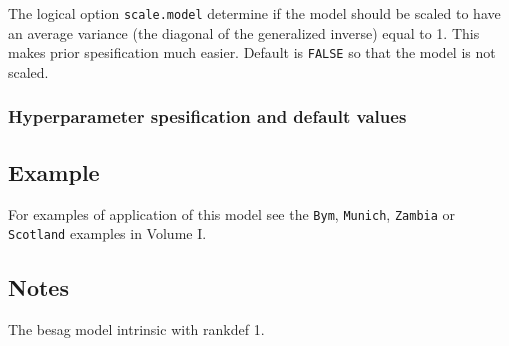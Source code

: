 \documentclass[a4paper,11pt]{article}
\begin{document}
The logical option \verb|scale.model| determine if the model should be
scaled to have an average variance (the diagonal of the generalized
inverse) equal to 1. This makes prior spesification much
easier. Default is \verb|FALSE| so that the model is not scaled.


\subsubsection*{Hyperparameter spesification and default values}


\subsection*{Example}

For examples of application of this model see the {\tt Bym}, {\tt Munich}, {\tt Zambia} or {\tt Scotland} examples in Volume I.

\subsection*{Notes}

The besag model intrinsic with rankdef 1.
\end{document}
